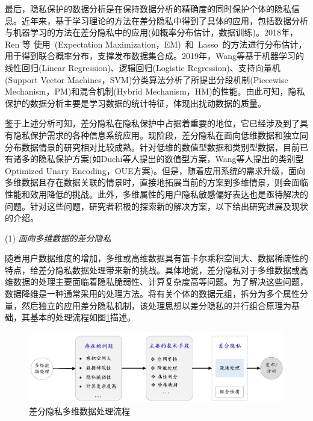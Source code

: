 最后，隐私保护的数据分析是在保持数据分析的精确度的同时保护个体的隐私信息\cite{wang2016on}。近年来，基于学习理论的方法在差分隐私中得到了具体的应用，包括数据分析与机器学习的方法在差分隐私中的应用\cite{kasiviswanathan2011what,ye2017optimal,sarwate2013signal}(如概率分布估计\cite{Murakami2018Toward}，数据训练\cite{xu2019ganobfuscator})。2018年，Ren 等\cite{ren2018textsf} 使用~(Expectation Maximization，EM)~和~Lasso~的方法进行分布估计，用于得到联合概率分布，支撑发布数据集合成。2019年，Wang等\cite{wang2019collecting}基于机器学习的线性回归(Linear Regression)、逻辑回归(Logistic Regression)、支持向量机(Support Vector Machines，SVM)分类算法分析了所提出分段机制(Piecewise Mechanism，PM)和混合机制(Hybrid Mechanism，HM)的性能。由此可知，隐私保护的数据分析主要是学习数据的统计特征，体现出扰动数据的质量。

鉴于上述分析可知，差分隐私在隐私保护中占据着重要的地位，它已经涉及到了具有隐私保护需求的各种信息系统应用。现阶段，差分隐私在面向低维数据和独立同分布数据情景的研究相对比较成熟。针对低维的数值型数据和类别型数据，目前已有诸多的隐私保护方案(如Duchi等人\cite{duchi2018minimax}提出的数值型方案，Wang等人\cite{wang2017locally}提出的类别型Optimized Unary Encoding，OUE方案)。但是，随着应用系统的需求升级，面向多维数据且存在数据关联的情景时，直接地拓展当前的方案到多维情景，则会面临性能和效用降低的挑战。此外，多维属性的用户隐私敏感偏好表达也是亟待解决的问题。针对这些问题，研究者积极的探索新的解决方案，以下给出研究进展及现状的介绍。



(1) {\em 面向多维数据的差分隐私}

随着用户数据维度的增加，多维或高维数据具有笛卡尔乘积空间大、数据稀疏性的特点，给差分隐私数据处理带来新的挑战。具体地说，差分隐私对于多维数据或高维数据的处理主要面临着隐私脆弱性、计算复杂度高等问题。为了解决这些问题，数据降维是一种通常采用的处理方法。将有关个体的数据元组，拆分为多个属性分量，然后独立的应用差分隐私机制，该处理思想以差分隐私的并行组合原理\cite{dwork2014algorithmic}为基础，其基本的处理流程如图\ref{fig:chapter02-multidimension-data}描述。

\begin{figure}[htbp]
	\centering
	\includegraphics[width = 0.85\linewidth]{./figures/chapter02_4.jpg}
	\caption{差分隐私多维数据处理流程}
	\label{fig:chapter02-multidimension-data}
\end{figure}

